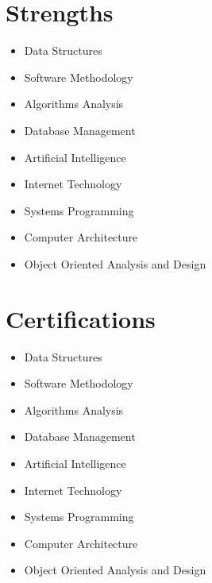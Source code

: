 \documentclass[letterpaper,11pt]{article}
\newcommand{\resumeSubHeadingListStart}{\begin{itemize}[leftmargin=0.0in, label={}]}
\newcommand{\resumeSubHeadingListEnd}{\end{itemize}}
\begin{document}
\section{Strengths}
    \begin{multicols}{4}
        \begin{itemize}[itemsep=-5pt, parsep=3pt]
            \item\small Data Structures
            \item Software Methodology
            \item Algorithms Analysis
            \item Database Management
            \item Artificial Intelligence
            \item Internet Technology
            \item Systems Programming
            \item Computer Architecture
            \item Object Oriented Analysis and Design
        \end{itemize}
    \end{multicols}
    \vspace*{2.0\multicolsep}

\section{Certifications}
    \begin{multicols}{4}
        \begin{itemize}[itemsep=-5pt, parsep=3pt]
            \item\small Data Structures
            \item Software Methodology
            \item Algorithms Analysis
            \item Database Management
            \item Artificial Intelligence
            \item Internet Technology
            \item Systems Programming
            \item Computer Architecture
            \item Object Oriented Analysis and Design
        \end{itemize}
    \end{multicols}
    \vspace*{2.0\multicolsep}
\end{document}

